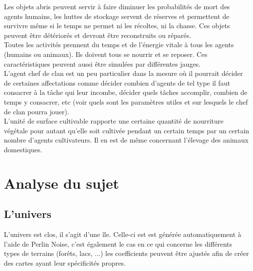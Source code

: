 \documentclass[12pt]{article}
\begin{document}
Les objets abris peuvent servir à faire diminuer les probabilités de mort des 
agents humains, les huttes de stockage servent de réserves et permettent de 
survivre même si le temps ne permet ni les récoltes, ni la chasse. Ces objets 
peuvent être détériorés et devront être reconstruits ou réparés.\\

Toutes les activités prennent du temps et de l'énergie vitale à tous les agents 
(humains ou animaux). Ils doivent tous se nourrir et se reposer. Ces 
caractéristiques peuvent aussi être simulées par différentes jauges.\\

L'agent chef de clan est un peu particulier dans la mesure où il pourrait 
décider de certaines affectations comme décider combien d'agents de tel type 
il faut consacrer à la tâche qui leur incombe, décider quels tâches accomplir, 
combien de temps y consacrer, etc (voir quels sont les paramètres utiles et 
sur lesquels le chef de clan pourra jouer).\\

L'unité de surface cultivable rapporte une certaine quantité de nourriture 
végétale pour autant qu'elle soit cultivée pendant un certain temps par un 
certain nombre d'agents cultivateurs. Il en est de même concernant l'élevage 
des animaux domestiques.\\


\section{Analyse du sujet}

	\subsection{L'univers}

L'univers est clos, il s'agit d'une île. Celle-ci est est générée 
automatiquement à l'aide de Perlin Noise, c'est également le cas en ce qui 
concerne les différents types de terrains (forêts, lacs, ...) les 
coefficients peuvent être ajustés afin de créer des cartes ayant leur 
spécificités propres.\\
\end{document}
